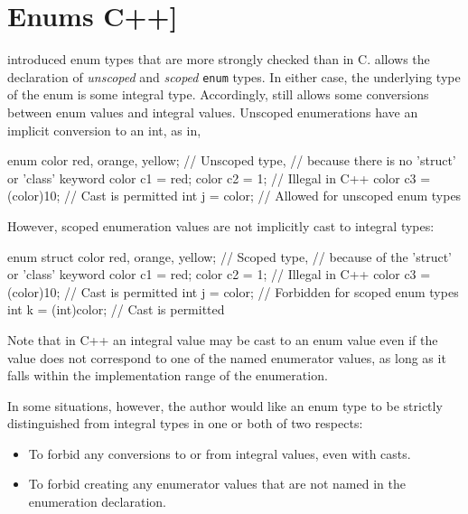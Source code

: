 \section{Enums C++]}
\label{sec:enums}


\lang{} introduced enum types that are more strongly checked than in C. \lang{} allows the declaration of \textit{unscoped} and \textit{scoped} \lstinline|enum| types. In either case, the underlying type of the enum is some integral type. Accordingly, \lang{} still allows some conversions between enum values and integral values. Unscoped enumerations have an implicit conversion to an int, as in,

\begin{listing-nonumber}
enum color { red, orange, yellow}; // Unscoped type, 
                        // because there is no 'struct' or 'class' keyword
color c1 = red;
color c2 = 1; // Illegal in C++
color c3 = (color)10; // Cast is permitted
int j = color; // Allowed for unscoped enum types
\end{listing-nonumber}

However, scoped enumeration values are not implicitly cast to integral types:

\begin{listing-nonumber}
enum struct color { red, orange, yellow}; // Scoped type, 
                        // because of the 'struct' or 'class' keyword
color c1 = red;
color c2 = 1; // Illegal in C++
color c3 = (color)10; // Cast is permitted
int j = color; // Forbidden for scoped enum types
int k = (int)color; // Cast is permitted
\end{listing-nonumber}

Note that in C++ an integral value may be cast to an enum value even if the value does not correspond to one of the named
enumerator values, as long as it falls within the implementation range of the enumeration.

In some situations, however, the author would like an enum type to be strictly distinguished from integral types in one or both of two respects:
\begin{itemize}
\item To forbid any conversions to or from integral values, even with casts.
\item To forbid creating any enumerator values that are not named in the enumeration declaration.
\end{itemize}

